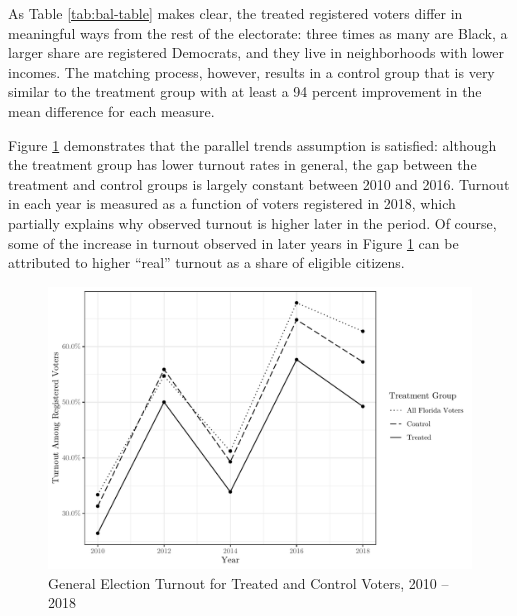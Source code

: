 \documentclass[
  12pt,
]{article}
\begin{document}
As Table \ref{tab:bal-table} makes clear, the treated registered voters differ in meaningful ways from the rest of the electorate: three times as many are Black, a larger share are registered Democrats, and they live in neighborhoods with lower incomes. The matching process, however, results in a control group that is very similar to the treatment group with at least a 94 percent improvement in the mean difference for each measure.

Figure \ref{fig:dind} demonstrates that the parallel trends assumption is satisfied: although the treatment group has lower turnout rates in general, the gap between the treatment and control groups is largely constant between 2010 and 2016. Turnout in each year is measured as a function of voters registered in 2018, which partially explains why observed turnout is higher later in the period. Of course, some of the increase in turnout observed in later years in Figure \ref{fig:dind} can be attributed to higher ``real'' turnout as a share of eligible citizens.

\begin{figure}[H]

{\centering \includegraphics{figure4_dind} 

}

\caption{\label{fig:dind}General Election Turnout for Treated and Control Voters, 2010 -- 2018}\label{fig:dind}
\end{figure}
\end{document}
